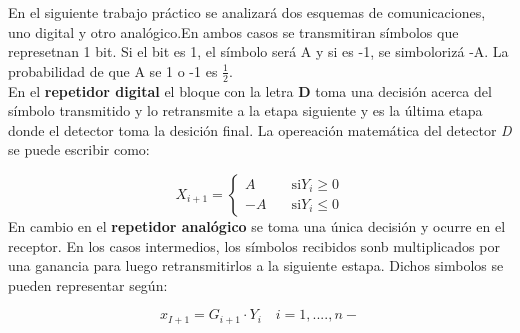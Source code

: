 	\indent En el siguiente trabajo práctico se analizará dos esquemas de comunicaciones, uno digital y otro analógico.En ambos casos se transmitiran símbolos que represetnan 1 bit. Si el bit es 1, el símbolo será A y si es -1, se simbolorizá -A. La probabilidad de que A se 1 o -1 es $\frac{1}{2}$.\\
	
	\indent En el \textbf{repetidor digital} el bloque con la letra \textbf{D} toma una decisión acerca del símbolo transmitido y lo retransmite a la etapa siguiente y es la última etapa donde el detector toma la desición final. La opereación matemática del detector \emph{D} se puede escribir como:
	
						\begin{equation}
							X_{i+1}=
									\begin{cases}
											A		& \quad \text{si} Y_i \geq 0 \\
											-A		& \quad \text{si} Y_i \leq 0
									\end{cases}
						\label{Eq.sis.digital}
						\end{equation}
	\indent En cambio en el \textbf{repetidor analógico} se toma una única decisión y ocurre en el receptor. En los casos intermedios, los símbolos recibidos sonb multiplicados por una ganancia para luego retransmitirlos a la siguiente estapa. Dichos simbolos se pueden representar según:
	
						\begin{equation}
							x_{I+1} = G_{i+1} \cdot Y_i \quad i=1,....,n-
							\label{Eq.sis.analogico}
						\end{equation}
